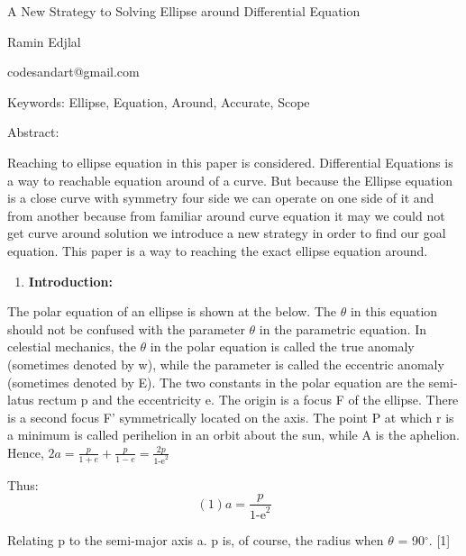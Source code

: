 \documentclass{article}
\begin{document}

\noindent A New Strategy to Solving Ellipse around Differential Equation

\noindent 

\noindent Ramin Edjlal

\noindent codesandart@gmail.com

\noindent Keywords: Ellipse, Equation, Around, Accurate, Scope

\noindent 

\noindent 

\noindent Abstract:

\noindent Reaching to ellipse equation in this paper is considered. Differential Equations is a way to reachable equation around of a curve. But because the Ellipse equation is a close curve with symmetry four side we can operate on one side of it and from another because from familiar around curve equation it may we could not get curve around solution we introduce a new strategy in order to find our goal equation. This paper is a way to reaching the exact ellipse equation around. 

\begin{enumerate}
\item  \textbf{Introduction:}
\end{enumerate}

\noindent The polar equation of an ellipse is shown at the below. The $\theta $ in this equation should not be confused with the parameter $\theta $ in the parametric equation. In celestial mechanics, the $\theta $ in the polar equation is called the true anomaly (sometimes denoted by w), while the parameter is called the eccentric anomaly (sometimes denoted by E). The two constants in the polar equation are the semi-latus rectum p and the eccentricity e. The origin is a focus F of the ellipse. There is a second focus F' symmetrically located on the axis. The point P at which r is a minimum is called perihelion in an orbit about the sun, while A is the aphelion. Hence, $2a=\frac{p}{1+e} +\frac{p}{1-e} =\frac{2p}{\mathop{1-e}\nolimits^{2} } $

\noindent Thus:
\[                         (1)                         a=\frac{p}{\mathop{1-e}\nolimits^{2} } \] 


\noindent  Relating p to the semi-major axis a. p is, of course, the radius when $\theta $ = 90${}^\circ$. [1]

\noindent 
\end{document}
